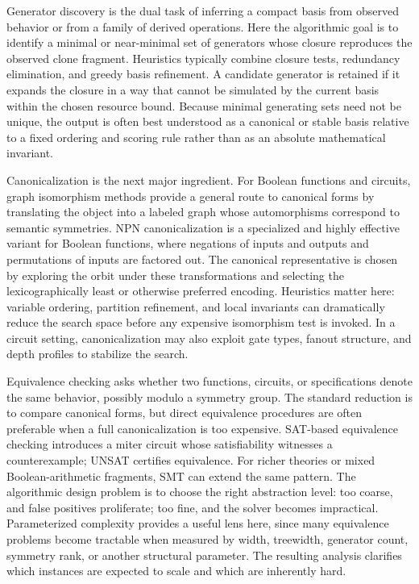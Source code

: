 \documentclass[11pt]{article}
\begin{document}
Generator discovery is the dual task of inferring a compact basis from observed behavior or from a family of derived operations. Here the algorithmic goal is to identify a minimal or near-minimal set of generators whose closure reproduces the observed clone fragment. Heuristics typically combine closure tests, redundancy elimination, and greedy basis refinement. A candidate generator is retained if it expands the closure in a way that cannot be simulated by the current basis within the chosen resource bound. Because minimal generating sets need not be unique, the output is often best understood as a canonical or stable basis relative to a fixed ordering and scoring rule rather than as an absolute mathematical invariant.

Canonicalization is the next major ingredient. For Boolean functions and circuits, graph isomorphism methods provide a general route to canonical forms by translating the object into a labeled graph whose automorphisms correspond to semantic symmetries. NPN canonicalization is a specialized and highly effective variant for Boolean functions, where negations of inputs and outputs and permutations of inputs are factored out. The canonical representative is chosen by exploring the orbit under these transformations and selecting the lexicographically least or otherwise preferred encoding. Heuristics matter here: variable ordering, partition refinement, and local invariants can dramatically reduce the search space before any expensive isomorphism test is invoked. In a circuit setting, canonicalization may also exploit gate types, fanout structure, and depth profiles to stabilize the search.

Equivalence checking asks whether two functions, circuits, or specifications denote the same behavior, possibly modulo a symmetry group. The standard reduction is to compare canonical forms, but direct equivalence procedures are often preferable when a full canonicalization is too expensive. SAT-based equivalence checking introduces a miter circuit whose satisfiability witnesses a counterexample; UNSAT certifies equivalence. For richer theories or mixed Boolean-arithmetic fragments, SMT can extend the same pattern. The algorithmic design problem is to choose the right abstraction level: too coarse, and false positives proliferate; too fine, and the solver becomes impractical. Parameterized complexity provides a useful lens here, since many equivalence problems become tractable when measured by width, treewidth, generator count, symmetry rank, or another structural parameter. The resulting analysis clarifies which instances are expected to scale and which are inherently hard.
\end{document}
